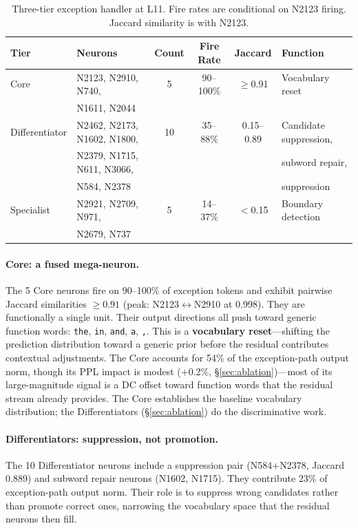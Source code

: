 \documentclass{article}
\begin{document}
\begin{table}[t]
\centering
\caption{Three-tier exception handler at L11. Fire rates are conditional on
N2123 firing. Jaccard similarity is with N2123.}
\label{tab:tiers}
\small
\begin{tabular}{@{}llcccl@{}}
\toprule
Tier & Neurons & Count & Fire Rate & Jaccard & Function \\
\midrule
Core & N2123, N2910, N740, & 5 & 90--100\% & $\geq$0.91 & Vocabulary reset \\
     & N1611, N2044 & & & & \\
Differentiator & N2462, N2173, N1602, N1800, & 10 & 35--88\% & 0.15--0.89 & Candidate suppression, \\
     & N2379, N1715, N611, N3066, & & & & subword repair, \\
     & N584, N2378 & & & & suppression \\
Specialist & N2921, N2709, N971, & 5 & 14--37\% & $<$0.15 & Boundary detection \\
     & N2679, N737 & & & & \\
\bottomrule
\end{tabular}
\end{table}

\paragraph{Core: a fused mega-neuron.}
The 5 Core neurons fire on 90--100\% of exception tokens and exhibit pairwise
Jaccard similarities $\geq 0.91$ (peak: N2123$\leftrightarrow$N2910 at 0.998).
They are functionally a single unit.
Their output directions all push toward generic function words:
\texttt{the}, \texttt{in}, \texttt{and}, \texttt{a}, \texttt{,}.
This is a \textbf{vocabulary reset}---shifting the prediction distribution toward
a generic prior before the residual contributes contextual adjustments.
The Core accounts for 54\% of the exception-path output norm, though its PPL
impact is modest (+0.2\%, \S\ref{sec:ablation})---most of its large-magnitude
signal is a DC offset toward function words that the residual stream already
provides.
The Core establishes the baseline vocabulary distribution; the Differentiators
(\S\ref{sec:ablation}) do the discriminative work.

\paragraph{Differentiators: suppression, not promotion.}
The 10 Differentiator neurons include a suppression pair
(N584$+$N2378, Jaccard 0.889) and subword repair neurons (N1602, N1715).
They contribute 23\% of exception-path output norm.
Their role is to suppress wrong candidates rather than promote correct ones,
narrowing the vocabulary space that the residual neurons then fill.
\end{document}
